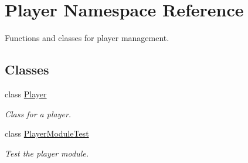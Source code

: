 \hypertarget{namespace_player}{
\section{\-Player \-Namespace \-Reference}
\label{namespace_player}
}


\-Functions and classes for player management.  


\subsection*{\-Classes}
\begin{DoxyCompactItemize}
\item 
class \hyperlink{class_player_1_1_player}{\-Player}
\begin{DoxyCompactList}\small\item\em \-Class for a player. \end{DoxyCompactList}\item 
class \hyperlink{class_player_1_1_player_module_test}{\-Player\-Module\-Test}
\begin{DoxyCompactList}\small\item\em \-Test the player module. \end{DoxyCompactList}\end{DoxyCompactItemize}
